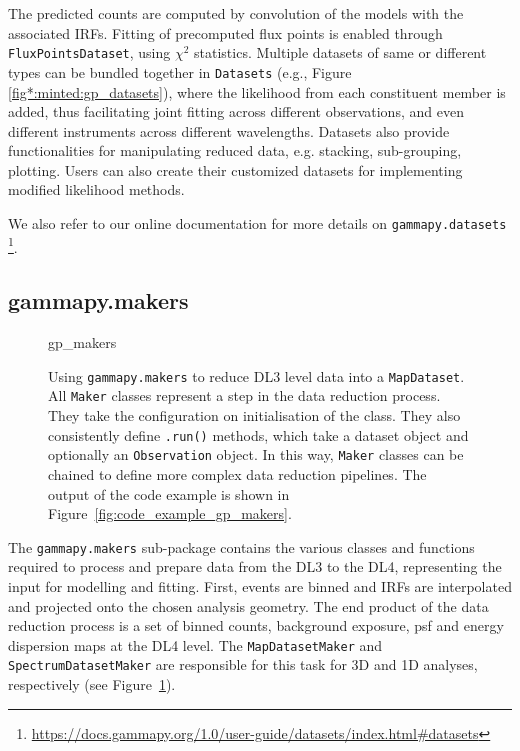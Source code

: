 \documentclass[longauth]{aa}
\newcommand{\code}[1]{\texttt{#1}}
\begin{document}
The predicted counts are computed by convolution of the models with the associated
IRFs. Fitting of precomputed flux points is enabled through \code{FluxPointsDataset},
using \emph{$\chi^2$} statistics. Multiple datasets of same or different types can be
bundled together in \code{Datasets} (e.g., Figure \ref{fig*:minted:gp_datasets}),
where the likelihood from each constituent member is added, thus facilitating
joint fitting across different observations, and even different instruments
across different wavelengths. Datasets also provide functionalities for
manipulating reduced data, e.g. stacking, sub-grouping, plotting. Users can
also create their customized datasets for implementing modified likelihood
methods.

We also refer to our online documentation for more details on \code{gammapy.datasets}
\footnote{\url{https://docs.gammapy.org/1.0/user-guide/datasets/index.html\#datasets}}.

\subsection{gammapy.makers}
\label{ssec:gammapy-makers}
%
\begin{figure}
	\small
    {gp_makers}
	\caption{
        Using \code{gammapy.makers} to reduce DL3 level data into a
		\code{MapDataset}. All \code{Maker} classes represent 
		a step in the data reduction process. They take
        the configuration on initialisation of the class. They 
		also consistently define \code{.run()} methods, which take
		a dataset object and optionally an \code{Observation} 
		object. In this way, \code{Maker} classes can be chained
		to define more complex data reduction pipelines. The output
		of the code example is shown in Figure~\ref{fig:code_example_gp_makers}.
    }
	\label{fig*:minted:gp_makers}
\end{figure}
%
The \code{gammapy.makers} sub-package contains the various classes and functions required
to process and prepare \gammaray data from the DL3 to the DL4, representing the input for modelling and fitting.
First, events are binned and IRFs are interpolated and projected onto the chosen analysis
geometry. The end product of the data reduction process is a set of binned counts,
background exposure, psf and energy dispersion maps at the DL4 level. 
The \code{MapDatasetMaker} and \code{SpectrumDatasetMaker} are
responsible for this task for 3D and 1D analyses, respectively (see Figure~\ref{fig*:minted:gp_makers}).
\end{document}

